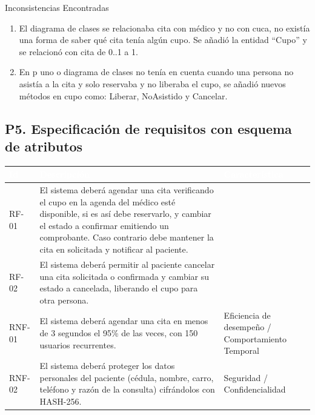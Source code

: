 \documentclass[11pt,a4paper,oneside]{article}
\newcommand{\hd}[1]{\cellcolor{darkblue}\textbf{\textcolor{white}{\small\sffamily #1}}}
\begin{document}
	Inconsistencias Encontradas
	
	\begin{enumerate}[leftmargin=1.4em,itemsep=2pt,topsep=2pt]
		\item El diagrama de clases se relacionaba cita con médico y no con cuca, no existía una forma de saber qué cita tenía algún cupo. Se añadió la entidad ``Cupo'' y se relacionó con cita de 0..1 a 1.
		\item En p uno o diagrama de clases no tenía en cuenta cuando una persona no asistía a la cita y solo reservaba y no liberaba el cupo, se añadió nuevos métodos en cupo como: Liberar, NoAsistido y Cancelar.
	\end{enumerate}
	
	\subsection*{P5. Especificaci\'on de requisitos con esquema de atributos}
	
	\begin{center}
		\small\sffamily
		\begin{tabularx}{\linewidth}{@{}L{1.7cm} X L{3.2cm}@{}}
			\toprule
			\hd{Id} & \hd{Descripción} & \hd{Característica}\\
			\midrule
			RF-01 & El sistema deberá agendar una cita verificando el cupo en la agenda del médico esté disponible, si es así debe reservarlo, y cambiar el estado a confirmar emitiendo un comprobante. Caso contrario debe mantener la cita en solicitada y notificar al paciente. & \\
			RF-02 & El sistema deberá permitir al paciente cancelar una cita solicitada o confirmada y cambiar su estado a cancelada, liberando el cupo para otra persona. & \\
			RNF-01 & El sistema deberá agendar una cita en menos de 3 segundos el 95\% de las veces, con 150 usuarios recurrentes. & Eficiencia de desempeño / Comportamiento Temporal\\
			RNF-02 & El sistema deberá proteger los datos personales del paciente (cédula, nombre, carro, teléfono y razón de la consulta) cifrándolos con HASH-256. & Seguridad / Confidencialidad\\
			\bottomrule
		\end{tabularx}
	\end{center}
	
\end{document}
